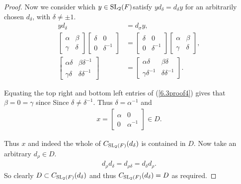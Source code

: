         
        \begin{proof}
        Now we consider which $y \in \operatorname{SL}_2(F)$satisfy $y d_\delta = d_\delta y$ for an arbitrarily chosen $d_\delta$, with $\delta \neq \pm 1$.
        \begin{align}\label{6.3proof4} y d_ \delta &= d_\sigma y, \nonumber \\[1.5ex]
        \begin{bmatrix} \alpha & \beta \\ \gamma & \delta \end{bmatrix} \begin{bmatrix} \delta & 0 \\ 0 & \delta^{-1} \end{bmatrix} &= \begin{bmatrix} \delta & 0 \\ 0 & \delta^{-1} \end{bmatrix} \begin{bmatrix} \alpha & \beta \\ \gamma & \delta \end{bmatrix}, \nonumber \\[1.5ex]
        \begin{bmatrix} \alpha \delta & \beta \delta^{-1} \\ \gamma \delta & \delta \delta^{-1} \end{bmatrix} &= \begin{bmatrix} \alpha \delta & \beta \delta \\ \gamma \delta^{-1} & \delta \delta^{-1} \end{bmatrix}.
        \end{align}
        
        Equating the top right and bottom left entries of (\ref{6.3proof4}) gives that $\beta = 0 = \gamma$ since Since $\delta \neq \delta^{-1}$. Thus $\delta = \alpha^{-1}$ and 
        \begin{align*} x = \begin{bmatrix} \alpha & 0 \\ 0 & \alpha^{-1} \end{bmatrix} \in D. 
        \end{align*}
        
        Thus $x$ and indeed the whole of $C_{\operatorname{SL}_2(F)}(d_\delta)$ is contained in $D$. Now take an arbitrary $d_\rho \in D$.
        \begin{align*} d_\rho d_\delta = d_{\rho \delta} = d_\delta d_\rho.
        \end{align*}
        So clearly $D \subset C_{\operatorname{SL}_2(F)}(d_\delta)$ and thus $C_{\operatorname{SL}_2(F)}(d_\delta) = D$ as required.
        \end{proof}

